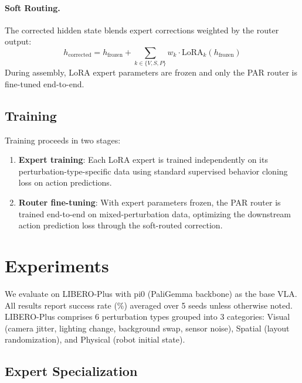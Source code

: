 \documentclass[10pt,twocolumn]{article}
\begin{document}
\paragraph{Soft Routing.}
The corrected hidden state blends expert corrections weighted by the router output:
\begin{equation}
    h_{\text{corrected}} = h_{\text{frozen}} + \sum_{k \in \{V,S,P\}} w_k \cdot \text{LoRA}_k(h_{\text{frozen}})
\end{equation}
During assembly, LoRA expert parameters are frozen and only the PAR router is fine-tuned end-to-end.

\subsection{Training}

Training proceeds in two stages:
\begin{enumerate}
    \item \textbf{Expert training}: Each LoRA expert is trained independently on its perturbation-type-specific data using standard supervised behavior cloning loss on action predictions.
    \item \textbf{Router fine-tuning}: With expert parameters frozen, the PAR router is trained end-to-end on mixed-perturbation data, optimizing the downstream action prediction loss through the soft-routed correction.
\end{enumerate}

\section{Experiments}
\label{sec:experiments}

We evaluate on LIBERO-Plus with pi0 (PaliGemma backbone) as the base VLA. All results report success rate (\%) averaged over 5 seeds unless otherwise noted. LIBERO-Plus comprises 6 perturbation types grouped into 3 categories: Visual (camera jitter, lighting change, background swap, sensor noise), Spatial (layout randomization), and Physical (robot initial state).

\subsection{Expert Specialization}
\label{sec:expert_specialization}
\end{document}
